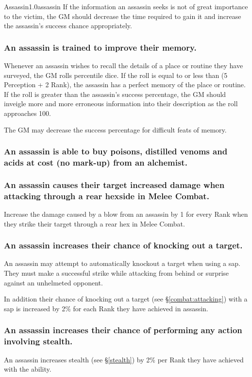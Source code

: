 \begin{skill}{Assassin}{1.0}{assassin}
If the information an assassin seeks is not of great importance to the
victim, the GM should decrease the time required to gain it and
increase the assassin's success chance appropriately.

\subsubsection{An assassin is trained to improve their memory.}

Whenever an assassin wishes to recall the details of a place or
routine they have surveyed, the GM rolls percentile dice.  If the roll
is equal to or less than (5 \x Perception + 2 \x Rank), the assassin
has a perfect memory of the place or routine.  If the roll is greater
than the assassin's success percentage, the GM should inveigle more
and more erroneous information into their description as the roll
approaches 100.

The GM may decrease the success percentage for difficult feats of
memory.

\subsubsection{An assassin is able to buy poisons, distilled venoms and
acids at cost (\ie no mark-up) from an alchemist.}


\subsubsection{An assassin causes their target increased damage when
attacking through a rear hexside in Melee Combat.}

Increase the damage caused by a blow from an assassin by 1 for every
Rank when they strike their target through a rear hex in Melee Combat.

\subsubsection{An assassin increases their chance of knocking out a
target.}

An assassin may attempt to automatically knockout a target when using
a sap.  They must make a successful strike while attacking from behind
or surprise against an unhelmeted opponent.

In addition their chance of knocking out a target (see
\S\ref{combat:attacking}) with a sap is increased by 2\% for each Rank
they have achieved in assassin.

\subsubsection{An assassin increases their chance of performing any action
involving stealth.}


An assassin increases stealth (see \S\ref{stealth}) by 2\% per Rank
they have achieved with the ability.

\end{skill}
